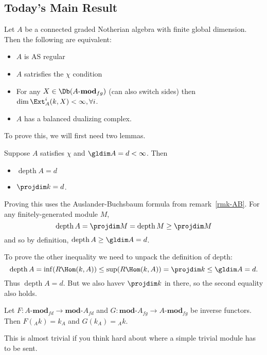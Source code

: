 \documentclass[12pt]{article}
\newcommand*{\modA}{\mathbf{mod}\text{-}A}
\newcommand*{\Amod}{A\text{-}\mathbf{mod}}
\DeclareMathOperator{\depth}{depth}
\begin{document}
\subsection{Today's Main Result}
\begin{thm}
	Let $A$ be a connected graded Notherian algebra with finite global dimension. Then the following are equivalent:
	\begin{itemize}
		\item $A$ is AS regular
		\item $A$ satrisfies the $\chi$ condition
		\item For any $X\in\Db(\Amod_{fg})$ (can also switch sides) then $\dim\Ext_A^i(k,X)<\infty,\forall i$.
		\item $A$ has a balanced dualizing complex.
	\end{itemize}
\end{thm}
To prove this, we will first need two lemmas.
\begin{lem}
	Suppose $A$ satisfies $\chi$  and $\gldim A=d<\infty$. Then 
	\begin{itemize}
		\item $\depth A=d$
		\item $\projdim k=d$.
	\end{itemize}
\end{lem}
\begin{prf}
	Proving this uses the Auslander-Buchsbaum formula from remark~\ref{rmk-AB}. For any finitely-generated module $M$,
	\[\depth A=\projdim M=\depth M\ge \projdim M\]
	and so by definition, $\depth A\ge \gldim A=d$.

	To prove the other inequality we need to unpack the definition of depth:
	\[\depth A=\inf(R\Hom(k,A))\le \sup(R \Hom(k,A))=\projdim k\le \gldim A=d.\]
	Thus $\depth A=d$. But we also havev $\projdim k$ in there, so the second equality also holds.
\end{prf}
\begin{lem}
	Let $F:\Amod_{fd}\to \modA_{fd}$ and $G:\modA_{fg}\to\Amod_{fg}$ be inverse functors. Then $F({_A}k)=k_A$
	and $G(k_A)={_A}k.$
\end{lem}
\begin{prf}
	This is almost trivial if you think hard about where a simple trivial module has to be sent.
\end{prf}
\end{document}
